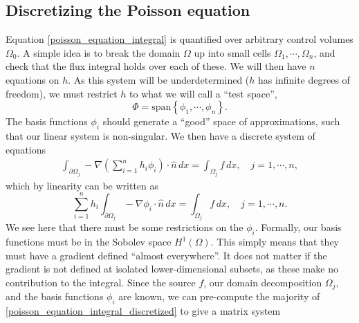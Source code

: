 \documentclass[11pt,a4paper]{memoir}
\newcommand{\om}{{\Omega}}
\newcommand{\pom}{{\partial\Omega}}
\begin{document}
\subsection{Discretizing the Poisson equation}\label{discretizing_poisson}
Equation \eqref{poisson_equation_integral} is quantified over arbitrary control volumes $\Omega_0$.
A simple idea is to break the domain $\Omega$ up into small cells $\Omega_1,\cdots,\Omega_n$, and check that the flux integral holds over each of these.
We will then have $n$ equations on $h$. As this system will be underdetermined ($h$ has infinite degrees of freedom), we must
restrict $h$ to what we will call a ``test space'',
    $$\Phi = \text{span}\left\{\phi_1,\cdots,\phi_n\right\}.$$
The basis functions $\phi_i$ should generate a ``good'' space of approximations,
such that our linear system is non-singular.
We then have a discrete system of equations
\begin{align*}
    \int_{\pom_j} -\nabla \left(\sum_{i=1}^n h_i\phi_i\right)\cdot \hat{n}\,dx = \int_{\om_j} f\,dx,\quad j=1,\cdots,n,
\end{align*}
which by linearity can be written as
\begin{equation}\label{poisson_equation_integral_discretized}
    \sum_{i=1}^n h_i\int_{\pom_j} -\nabla \phi_i \cdot \hat{n}\,dx = \int_{\om_j} f\,dx,\quad j=1,\cdots,n.
\end{equation}
We see here that there must be some restrictions on the $\phi_i$.
Formally, our basis functions must be in the Sobolev space $H^1(\Omega)$. This simply means that they must have a gradient defined ``almost everywhere''.
It does not matter if the gradient is not defined at isolated lower-dimensional subsets, as these make no contribution to
the integral. Since the source $f$, our domain decomposition $\Omega_j$, and the basis functions $\phi_i$ are known, we can pre-compute
the majority of \eqref{poisson_equation_integral_discretized} to give a matrix system
\end{document}
